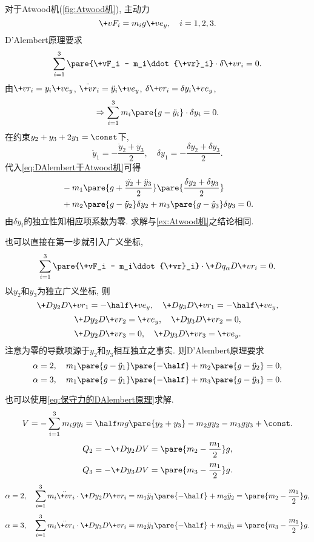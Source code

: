 \documentclass{ctexart}
\begin{document}
\begin{sample}
    \begin{ex}
        对于Atwood机(\cref{fig:Atwood机}), 主动力
        \[ \+vF_i = m_i g\+ve_y,\quad i = 1,2,3. \]
        D'Alembert原理要求
        \[ \sum_{i=1}^3 \pare{\+vF_i - m_i\ddot{\+vr}_i}\cdot \delta\+vr_i = 0. \]
        由$\+vr_i = y_i\+ve_y$, $\ddot{\+vr}_i = \ddot{y}_i\+ve_y$, $\delta \+vr_i = \delta y_i \+ve_y$,
        \begin{equation}
            \label{eq:DAlembert于Atwood机}
            \Rightarrow \sum_{i=1}^3 m_i\pare{g  - \ddot{y}_i}\cdot\delta y_i = 0. 
        \end{equation}
        在约束$y_2+y_3 + 2y_1 = \const$下,
        \[ \ddot{y}_1 = -\frac{\ddot{y}_2 + \ddot{y_3}}{2},\quad \delta y_1 = -\frac{\delta y_2 + \delta y_3}{2}. \]
        代入\eqref{eq:DAlembert于Atwood机}可得
        \begin{align*}
            &-m_1\pare{g+\frac{\ddot{y_2} + \ddot{y}_3}{2}}\pare{\frac{\delta y_2 + \delta y_3}{2}} \\
            &+ m_2\pare{g - \ddot{y}_2}\delta y_2 + m_3\pare{g - \ddot{y}_3}\delta y_3 = 0.
        \end{align*}
        由$\delta y_i$的独立性知相应项系数为零. 求解与\cref{ex:Atwood机}之结论相同.
    \end{ex}
    \begin{ex}
        也可以直接在第一步就引入广义坐标,
        \[ \sum_{i=1}^3 \pare{\+vF_i - m_i\ddot{\+vr}_i}\cdot\+D{q_\alpha}D{\+vr_i} = 0. \]
        以$y_2$和$y_3$为独立广义坐标, 则
        \[ \+D{y_2}D{\+vr_1} = -\half\+ve_y,\quad \+D{y_3}D{\+vr_1} = -\half\+ve_y, \]
        \[ \+D{y_2}D{\+vr_2} = \+ve_y,\quad \+D{y_3}D{\+vr_2} = 0, \]
        \[ \+D{y_2}D{\+vr_3} = 0,\quad \+D{y_3}D{\+vr_3} = \+ve_y. \]
        注意为零的导数项源于$y_2$和$y_3$相互独立之事实. 则D'Alembert原理要求
        \[ \alpha=2,\quad m_1\pare{g-\ddot{y}_1}\pare{-\half} + m_2\pare{g-\ddot{y}_2} = 0, \]
        \[ \alpha=3,\quad m_1\pare{g-\ddot{y}_1}\pare{-\half} + m_3\pare{g-\ddot{y}_3} = 0. \]
    \end{ex}
    \begin{ex}
        也可以使用\eqref{eq:保守力的DAlembert原理}求解.
        \[ V = -\sum_{i=1}^3 m_i g y_i = \half mg\pare{y_2+y_3} - m_2 gy_2 - m_3gy_3 + \const. \]
        \[ Q_2 = -\+D{y_2}D{V} = \pare{m_2 - \frac{m_1}{2}}g, \]
        \[ Q_3 = -\+D{y_3}D{V} = \pare{m_3 - \frac{m_1}{2}}g. \]
        \[ \alpha=2,\quad \sum_{i=1}^3 m_i\ddot{\+vr}_i\cdot\+D{y_2}D{\+vr_i} = m_1 \ddot{y}_1 \pare{-\half} + m_2\ddot{y}_2 = \pare{m_2 - \frac{m_1}{2}}g, \]
        \[ \alpha=3,\quad \sum_{i=1}^3 m_i\ddot{\+vr}_i\cdot\+D{y_3}D{\+vr_i} = m_2 \ddot{y}_1 \pare{-\half} + m_3\ddot{y}_3 = \pare{m_3 - \frac{m_1}{2}}g. \]
    \end{ex}
\end{sample}
\end{document}
